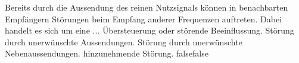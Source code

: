     {Bereits durch die Aussendung des reinen Nutzsignals können in benachbarten Empfängern Störungen beim Empfang anderer Frequenzen auftreten. Dabei handelt es sich um eine ...}
    {Übersteuerung oder störende Beeinflussung.}
    {Störung durch unerwünschte Aussendungen.}
    {Störung durch unerwünschte Nebenaussendungen.}
    {hinzunehmende Störung.}
    {false}{false}